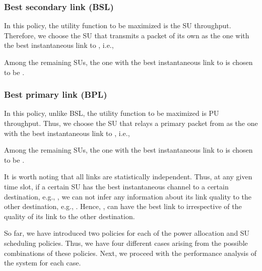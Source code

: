 \documentclass[journal,twocolumn]{IEEEtran}
\begin{document}
\subsubsection{Best secondary link (BSL)}\label{BSL}
In this policy, the utility function to be maximized is the SU throughput. Therefore,
we choose the SU that transmits a packet of its own as the one with the best instantaneous link to , i.e.,

Among the remaining  SUs, the one with the best instantaneous link to  is chosen to be .

\subsubsection{Best primary link (BPL)}\label{BPL}
In this policy, unlike BSL, the utility function to be maximized is PU throughput. Thus,
we choose the SU that relays a primary packet from  as the one with the best instantaneous link to , i.e.,

Among the remaining  SUs, the one with the best instantaneous link to  is chosen to be .

It is worth noting that all links  are statistically independent. Thus, at any given time slot, if a certain
SU has the best instantaneous channel to a certain destination, e.g., , we can not infer any information about its link quality to the
other destination, e.g., . Hence, ,  can have the best link to  irrespective of the quality of
its link to the other destination.

So far, we have introduced two policies for each of the power allocation and SU scheduling policies. Thus, we have four different cases
arising from the possible combinations of these policies. Next, we proceed with the performance analysis of the system for each case.
\end{document}
